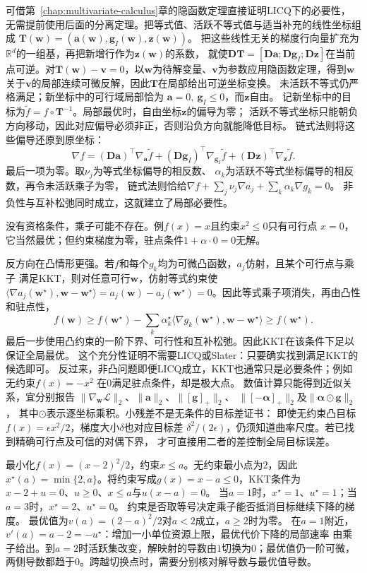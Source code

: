 可借第~\ref{chap:multivariate-calculus}章的隐函数定理直接证明LICQ下的必要性，
无需提前使用后面的分离定理。把等式值、活跃不等式值与适当补充的线性坐标组成
$\bm T(\bm w)=(\bm a(\bm w),\bm g_I(\bm w),\bm z(\bm w))$。
把这些线性无关的梯度行向量扩充为$\mathbb R^d$的一组基，再把新增行作为$\bm z(\bm w)$的系数，
就使$\bm D\bm T=[\bm D\bm a;\bm D\bm g_I;\bm D\bm z]$在当前点可逆。对$\bm T(\bm w)-\bm v=0$，以$\bm w$为待解变量、$\bm v$为参数应用隐函数定理，得到$\bm w$关于$\bm v$的局部连续可微反解，因此$\bm T$在局部给出可逆坐标变换。
未活跃不等式仍严格满足；新坐标中的可行域局部恰为
$\bm a=0,\ \bm g_I\leq0$，而$\bm z$自由。
记新坐标中的目标为$\widetilde f=f\circ\bm T^{-1}$。局部最优时，自由坐标$\bm z$的偏导为零；
活跃不等式坐标只能朝负方向移动，因此对应偏导必须非正，否则沿负方向就能降低目标。
链式法则将这些偏导还原到原坐标：
\[
 \nabla f=(\bm D\bm a)^\top\nabla_{\bm a}\widetilde f
          +(\bm D\bm g_I)^\top\nabla_{\bm g_I}\widetilde f
          +(\bm D\bm z)^\top\nabla_{\bm z}\widetilde f.
\]
最后一项为零。取$\nu_j$为等式坐标偏导的相反数、
$\alpha_k$为活跃不等式坐标偏导的相反数，再令未活跃乘子为零，
链式法则恰给$\nabla f+\sum_j\nu_j\nabla a_j+\sum_k\alpha_k\nabla g_k=0$。
非负性与互补松弛同时成立，这就建立了局部必要性。

没有资格条件，乘子可能不存在。例$f(x)=x$且约束$x^2\leq0$只有可行点
$x=0$，它当然最优；但约束梯度为零，驻点条件$1+\alpha\cdot0=0$无解。

反方向在凸情形更强。若$f$和每个$g_k$均为可微凸函数，$a_j$仿射，且某个可行点与乘子
满足KKT，则对任意可行$\bm{w}$，仿射等式约束使
$\langle\nabla a_j(\bm{w}^{\star}),\bm{w}-\bm{w}^{\star}\rangle
=a_j(\bm{w})-a_j(\bm{w}^{\star})=0$。因此等式乘子项消失，再由凸性和驻点性，
\[
  f(\bm{w})\geq
  f(\bm{w}^{\star})
  -\sum_k\alpha_k^{\star}
  \langle\nabla g_k(\bm{w}^{\star}),\bm{w}-\bm{w}^{\star}\rangle
  \geq f(\bm{w}^{\star}).
\]
最后一步使用凸约束的一阶下界、可行性和互补松弛。因此KKT在该条件下足以保证全局最优。
这个充分性证明不需要LICQ或Slater：只要确实找到满足KKT的候选即可。
反过来，非凸问题即便LICQ成立，KKT也通常只是必要条件；例如无约束$f(x)=-x^2$
在$0$满足驻点条件，却是极大点。
数值计算只能得到近似关系，宜分别报告
$\|\nabla_{\bm w}\mathcal L\|_2$、$\|\bm a\|_2$、$\|[\bm g]_+\|_2$、
$\|[-\bm\alpha]_+\|_2$及$\|\bm\alpha\odot\bm g\|_2$，
其中$\odot$表示逐坐标乘积。小残差不是无条件的目标差证书：
即使无约束凸目标$f(x)=\epsilon x^2/2$，梯度大小$\delta$也对应目标差
$\delta^2/(2\epsilon)$，仍须知道曲率尺度。若已找到精确可行点及可信的对偶下界，
才可直接用二者的差控制全局目标误差。

\begin{example}[活跃约束与乘子]
\label{ex:opt-scalar-active-constraint}
最小化$f(x)=(x-2)^2/2$，约束$x\leq a$。无约束最小点为$2$，因此
$x^\star(a)=\min\{2,a\}$。将约束写成$g(x)=x-a\leq0$，KKT条件为
$x-2+u=0$、$u\geq0$、$x\leq a$与$u(x-a)=0$。
当$a=1$时，$x^\star=1$、$u^\star=1$；当$a=3$时，$x^\star=2$、$u^\star=0$。
约束是否取等号决定乘子能否抵消目标继续下降的梯度。
最优值为$v(a)=(2-a)^2/2$对$a<2$成立，$a\geq2$时为零。
在$a=1$附近，$v'(a)=a-2=-u^\star$：增加一小单位资源上限，最优代价下降的局部速率
由乘子给出。到$a=2$时活跃集改变，解映射的导数由$1$切换为$0$；最优值仍一阶可微，两侧导数都趋于$0$。跨越切换点时，需要分别核对解导数与最优值导数。
\end{example}

